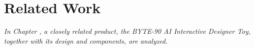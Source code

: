 \chapter{Related Work}
\label{chapter:related-work}

\textit{In Chapter \thechapter, a closely related product, the BYTE-90 AI Interactive Designer Toy, together with its design and components, are analyzed.}

